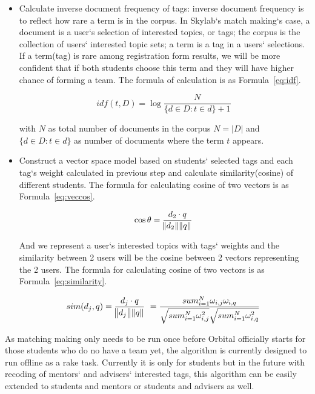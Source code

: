 \begin{itemize}
  \item Calculate inverse document frequency of tags: inverse document frequency is to reflect how rare a term is in the corpus\cite{citationir}. In Skylab`s match making`s case, a document is a user`s selection of interested topics, or tags; the corpus is the collection of users` interested topic sets; a term is a tag in a users` selections. If a term(tag) is rare among registration form results, we will be more confident that if both students choose this term and they will have higher chance of forming a team. The formula of calculation is as Formula~\ref{eq:idf}.

  \begin{equation}
    idf(t,D) = \log \frac{N}{\{ d \in D : t \in d \} + 1} \
    \label{eq:idf}
  \end{equation}
  
  with \(N\) as total number of documents in the corpus \( N = |D| \) and \(\{ d \in D : t \in d \}\) as number of documents where the term \(t\) appears\cite{citationir}.

  \item Construct a vector space model based on students` selected tags and each tag`s weight calculated in previous step and calculate similarity(cosine) of different students. The formula for calculating cosine of two vectors is as Formula~\ref{eq:veccos}\cite{citationvecspacemodel}.

  \begin{equation}
    \cos\theta  = \frac{d_2 \cdot q}{ \norm{d_2} \norm{q} } \
    \label{eq:veccos}
  \end{equation}

  And we represent a user`s interested topics with tags` weights and the similarity between 2 users will be the cosine between 2 vectors representing the 2 users. The formula for calculating cosine of two vectors is as Formula~\ref{eq:similarity}\cite{citationvecspacemodel}.

  \begin{equation}
    sim(d_j, q)  = \frac{d_j \cdot q}{ \norm{d_j} \norm{q} } \ = \frac{sum_{i=1}^{N} \omega_{i,j} \omega_{i,q}}{ \sqrt{sum_{i=1}^{N} \omega_{i,j}^2} \sqrt{sum_{i=1}^{N} \omega_{i,q}^2}} \
    \label{eq:similarity}
  \end{equation}

\end{itemize}

As matching making only needs to be run once before Orbital officially starts for those students who do no have a team yet, the algorithm is currently designed to run offline as a rake task. Currently it is only for students but in the future with recoding of mentors` and advisers` interested tags, this algorithm can be easily extended to students and mentors or students and advisers as well.

